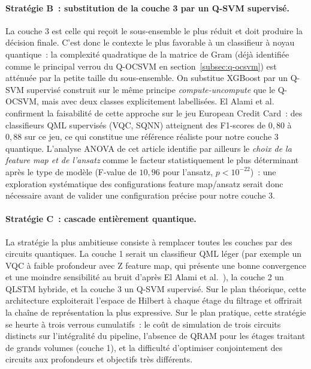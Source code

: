 \documentclass[a4paper]{article}
\begin{document}
\paragraph{Stratégie B~: substitution de la couche 3 par un Q-SVM supervisé.} La couche 3 est celle qui reçoit le sous-ensemble le plus réduit et doit produire la décision finale. C'est donc le contexte le plus favorable à un classifieur à noyau quantique~: la complexité quadratique de la matrice de Gram (déjà identifiée comme le principal verrou du Q-OCSVM en section~\ref{subsec:q-ocsvm}) est atténuée par la petite taille du sous-ensemble. On substitue XGBoost par un Q-SVM supervisé construit sur le même principe \emph{compute-uncompute} que le Q-OCSVM, mais avec deux classes explicitement labellisées. El Alami et al.~\cite{elalami2026} confirment la faisabilité de cette approche sur le jeu European Credit Card~: des classifieurs QML supervisés (VQC, SQNN) atteignent des F1-scores de $0{,}80$ à $0{,}88$ sur ce jeu, ce qui constitue une référence réaliste pour notre couche 3 quantique. L'analyse ANOVA de cet article identifie par ailleurs le \emph{choix de la feature map et de l'ansatz} comme le facteur statistiquement le plus déterminant après le type de modèle (F-value de $10{,}96$ pour l'ansatz, $p < 10^{-22}$)~: une exploration systématique des configurations feature map/ansatz serait donc nécessaire avant de valider une configuration précise pour notre couche 3.
 
\paragraph{Stratégie C~: cascade entièrement quantique.} La stratégie la plus ambitieuse consiste à remplacer toutes les couches par des circuits quantiques. La couche 1 serait un classifieur QML léger (par exemple un VQC à faible profondeur avec Z feature map, qui présente une bonne convergence et une moindre sensibilité au bruit d'après El Alami et al.~\cite{elalami2026}), la couche 2 un QLSTM hybride, et la couche 3 un Q-SVM supervisé. Sur le plan théorique, cette architecture exploiterait l'espace de Hilbert à chaque étage du filtrage et offrirait la chaîne de représentation la plus expressive. Sur le plan pratique, cette stratégie se heurte à trois verrous cumulatifs~: le coût de simulation de trois circuits distincts sur l'intégralité du pipeline, l'absence de QRAM pour les étages traitant de grands volumes (couche 1), et la difficulté d'optimiser conjointement des circuits aux profondeurs et objectifs très différents.
 
\end{document}
